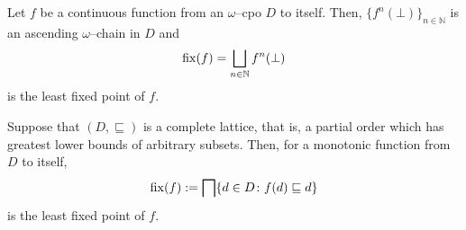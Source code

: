 \begin{thm}\label{thm:cpo-fixed}
  Let \(f\) be a continuous function from an \(\omega\)--cpo \(D\) to itself.
  Then, \(\lbrace f^n(\bot) \rbrace_{n \in \mathbb{N}}\) is an ascending \(\omega\)--chain in \(D\) and
  \begin{equation}
    \operatorname{fix}(f) = \bigsqcup_{n \in \mathbb{N}} f^n(\bot)
  \end{equation}
  is the least fixed point of \(f\).  
\end{thm}

\begin{thm}\label{thm:knaster-tarski}
  Suppose that \((D, {}\sqsubseteq)\) is a complete lattice, that is, a partial order which has greatest lower bounds of arbitrary subsets.
  Then, for a monotonic function from \(D\) to itself,
  \begin{equation}
    \fix(f) := \bigsqcap\lbrace d \in D \colon f(d) \sqsubseteq d \rbrace
  \end{equation}
  is the least fixed point of \(f\).
\end{thm}